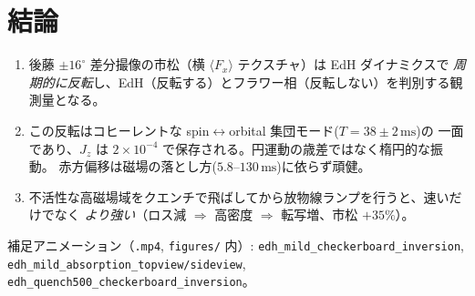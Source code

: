 \documentclass[11pt]{ltjsarticle}
\newcommand{\Fx}{\langle F_x\rangle}
\newcommand{\Jz}{J_z}
\newcommand{\ms}{\,\mathrm{ms}}
\begin{document}
\section{結論}
\begin{enumerate}\itemsep2pt
  \item 後藤 $\pm16^\circ$ 差分撮像の市松（横 $\Fx$ テクスチャ）は EdH ダイナミクスで
        \emph{周期的に反転}し、EdH（反転する）とフラワー相（反転しない）を判別する観測量となる。
  \item この反転はコヒーレントな spin$\leftrightarrow$orbital 集団モード($T=38\pm2\ms$)の
        一面であり、$\Jz$ は $2\times10^{-4}$ で保存される。円運動の歳差ではなく楕円的な振動。
        赤方偏移は磁場の落とし方($5.8$--$130\ms$)に依らず頑健。
  \item 不活性な高磁場域をクエンチで飛ばしてから放物線ランプを行うと、速いだけでなく
        \emph{より強い}（ロス減 $\Rightarrow$ 高密度 $\Rightarrow$ 転写増、市松 $+35\%$）。
\end{enumerate}
補足アニメーション（\texttt{.mp4}, \texttt{figures/} 内）:
\texttt{edh\_mild\_checkerboard\_inversion}, \texttt{edh\_mild\_absorption\_topview/sideview},
\texttt{edh\_quench500\_checkerboard\_inversion}。
\end{document}
